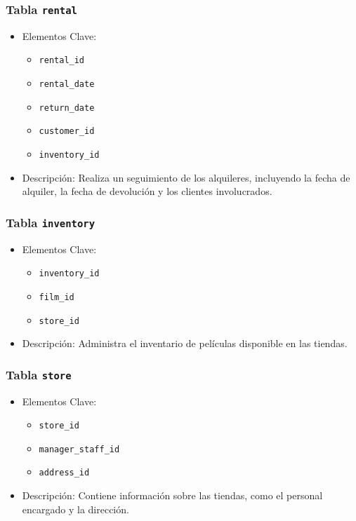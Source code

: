 \documentclass[11pt]{report}
\begin{document}
		\subsubsection{Tabla \texttt{rental}}
		\begin{itemize}
		  \item Elementos Clave:
		  \begin{itemize}
			\item \texttt{rental\_id}
			\item \texttt{rental\_date}
			\item \texttt{return\_date}
			\item \texttt{customer\_id}
			\item \texttt{inventory\_id}
		  \end{itemize}
		  \item Descripción: Realiza un seguimiento de los alquileres, incluyendo la fecha de alquiler, la fecha de devolución y los clientes involucrados.
		\end{itemize}
		
		\subsubsection{Tabla \texttt{inventory}}
		\begin{itemize}
		  \item Elementos Clave:
		  \begin{itemize}
			\item \texttt{inventory\_id}
			\item \texttt{film\_id}
			\item \texttt{store\_id}
		  \end{itemize}
		  \item Descripción: Administra el inventario de películas disponible en las tiendas.
		\end{itemize}
		
		\subsubsection{Tabla \texttt{store}}
		\begin{itemize}
		  \item Elementos Clave:
		  \begin{itemize}
			\item \texttt{store\_id}
			\item \texttt{manager\_staff\_id}
			\item \texttt{address\_id}
		  \end{itemize}
		  \item Descripción: Contiene información sobre las tiendas, como el personal encargado y la dirección.
		\end{itemize}
		
\end{document}
